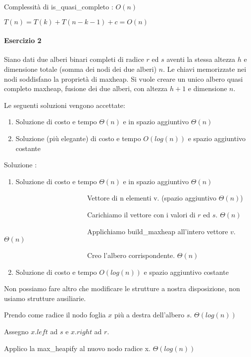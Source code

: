 



{Complessità di is\_quasi\_completo : $O(n)$}

$T(n) = T(k) + T(n-k-1) + c = O(n)$

\paragraph{Esercizio 2}

{Siano dati due alberi binari completi di radice $r$ ed $s$ aventi la stessa altezza $h$ e dimensione totale (somma dei nodi dei due alberi) $n$. Le chiavi memorizzate nei nodi soddisfano la proprietà di maxheap. Si vuole creare un unico albero quasi completo maxheap, fusione dei due alberi, con altezza $h+1$ e dimensione $n$.}

{Le seguenti soluzioni vengono accettate:}

\begin{enumerate}
\tightlist
\item
  {Soluzione di costo e tempo $\Theta(n)$ e in spazio aggiuntivo $\Theta(n)$}
\item
  {Soluzione (più elegante) di costo e tempo $O(log(n))$ e spazio aggiuntivo costante}
\end{enumerate}

{Soluzione :}

\begin{enumerate}
\tightlist
\item
  {Soluzione di costo e tempo $\Theta(n)$ e in spazio aggiuntivo $\Theta(n)$}
\end{enumerate}

{~~~~~~~~~~~~~~~~~~~~~~~~Vettore di n elementi v. (spazio aggiuntivo $\Theta(n)$)}

{~~~~~~~~~~~~~~~~~~~~~~~~Carichiamo il vettore con i valori di $r$ ed $s$. $\Theta(n)$}

{~~~~~~~~~~~~~~~~~~~~~~~~Applichiamo build\_maxheap all'intero vettore $v$. $\Theta(n)$}

{~~~~~~~~~~~~~~~~~~~~~~~~Creo l'albero corrispondente. $\Theta(n)$}

\begin{enumerate}
\setcounter{enumi}{1}
\tightlist
\item
  {Soluzione di costo e tempo $O(log(n))$ e spazio aggiuntivo costante}
\end{enumerate}

{Non possiamo fare altro che modificare le strutture a nostra disposizione, non usiamo strutture ausiliarie.}

{Prendo come radice il nodo foglia $x$ più a destra dell'albero $s$. $\Theta(log(n))$}

{Assegno $x.left$ ad $s$ e $x.right$ ad $r$.}

{Applico la max\_heapify al nuovo nodo radice x. $\Theta(log(n))$}
